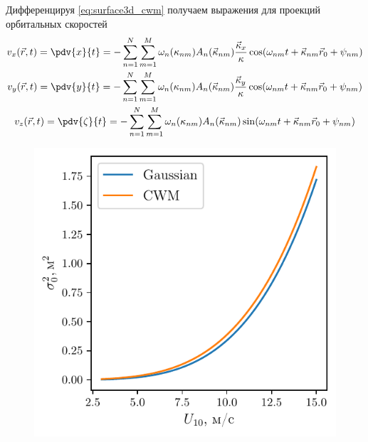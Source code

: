 Дифференцируя \eqref{eq:surface3d_cwm} получаем выражения для
проекций орбитальных
скоростей 
\begin{equation}
    \begin{gathered}
        \label{eq:orbital_velocity}
        v_x(\vec r, t)  = \pdv{x}{t} = - \fullsum \omega_n(\kappa_{nm}) A_n(\vec
        \kappa_{nm}) \frac{\vec \kappa_x}{\kappa} \cos(\fullphase) \\
        v_y (\vec r, t) = \pdv{y}{t} = - \fullsum \omega_n(\kappa_{nm}) A_n(\vec
        \kappa_{nm}) \frac{\vec \kappa_y}{\kappa}\cos(\fullphase) \\
        v_z (\vec r, t) = \pdv{\zeta}{t} = - \fullsum \omega_n(\kappa_{nm})
        A_n(\vec \kappa_{nm})
        \sin(\fullphase)
    \end{gathered}
\end{equation}


\begin{figure}[h]
    \centering
    \includegraphics[width=0.6\linewidth]{figs/cwm_variance}
    \caption{}
    \label{fig:}
\end{figure}


